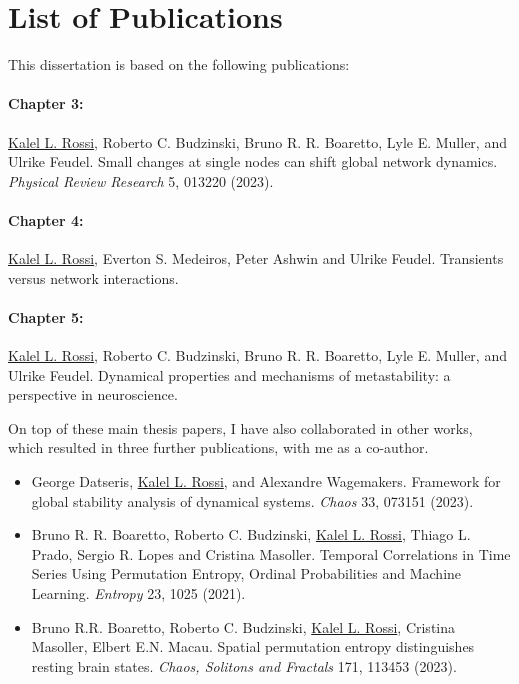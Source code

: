 
\section*{List of Publications}
This dissertation is based on the following publications:

\paragraph{Chapter 3:}
\underline{Kalel L. Rossi}, Roberto C. Budzinski, Bruno R. R. Boaretto, Lyle E. Muller, and Ulrike Feudel.  Small changes at single nodes can shift global network dynamics. \textit{Physical Review Research} 5, 013220 (2023). 

\paragraph{Chapter 4:}
\underline{Kalel L. Rossi}, Everton S. Medeiros, Peter Ashwin and Ulrike Feudel. Transients versus network interactions.

\paragraph{Chapter 5:}
\underline{Kalel L. Rossi}, Roberto C. Budzinski, Bruno R. R. Boaretto, Lyle E. Muller, and Ulrike Feudel. Dynamical properties and mechanisms of metastability: a perspective in neuroscience. 

\vspace{1cm}


On top of these main thesis papers, I have also collaborated in other works, which resulted in three further publications, with me as a co-author.
\begin{itemize}
    \item George Datseris, \underline{Kalel L. Rossi}, and Alexandre Wagemakers. Framework for global stability analysis of dynamical systems. \textit{Chaos} 33, 073151 (2023).
    \item Bruno R. R. Boaretto, Roberto C. Budzinski, \underline{Kalel L. Rossi}, Thiago L. Prado, Sergio R. Lopes and Cristina Masoller. Temporal Correlations in Time Series Using Permutation Entropy, Ordinal Probabilities and Machine Learning. \textit{Entropy} 23, 1025 (2021).
    \item Bruno R.R. Boaretto, Roberto C. Budzinski, \underline{Kalel L. Rossi}, Cristina Masoller, Elbert E.N. Macau. Spatial permutation entropy distinguishes resting brain states. \textit{Chaos, Solitons and Fractals} 171, 113453 (2023).
\end{itemize}